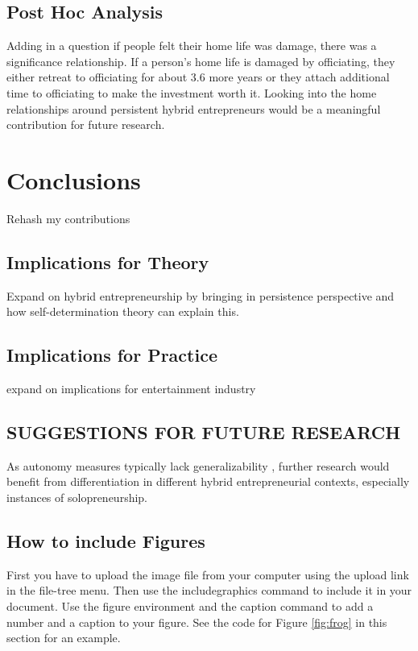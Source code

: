 \documentclass{article}
\begin{document}
\subsection{Post Hoc Analysis}
Adding in a question if people felt their home life was damage, there was a significance relationship.  If a person’s home life is damaged by officiating, they either retreat to officiating for about 3.6 more years or they attach additional time to officiating to make the investment worth it.  Looking into the home relationships around persistent hybrid entrepreneurs would be a meaningful contribution for future research.


\section{Conclusions}

Rehash my contributions

\subsection{Implications for Theory}
Expand on hybrid entrepreneurship by bringing in persistence perspective and how self-determination theory can explain this.


\subsection{Implications for Practice}
expand on implications for entertainment industry

\subsection{SUGGESTIONS FOR FUTURE RESEARCH}
As autonomy measures typically lack generalizability \cite{lumpkin2009understanding}, further research would benefit from differentiation in different hybrid entrepreneurial contexts, especially instances of solopreneurship. 

\subsection{How to include Figures}

First you have to upload the image file from your computer using the upload link in the file-tree menu. Then use the includegraphics command to include it in your document. Use the figure environment and the caption command to add a number and a caption to your figure. See the code for Figure \ref{fig:frog} in this section for an example.
\end{document}
